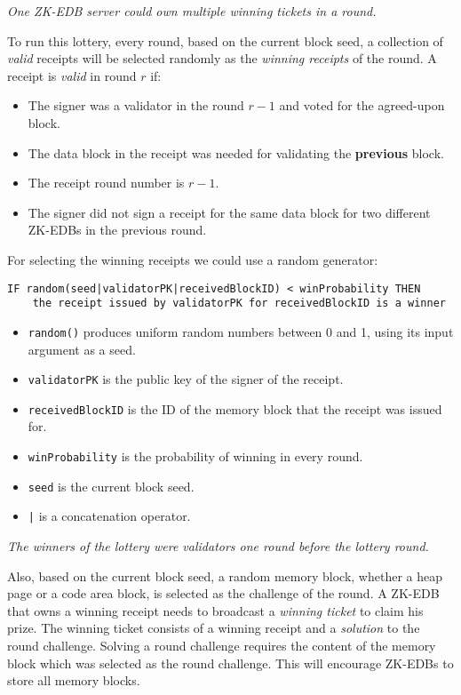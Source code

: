 \documentclass[11pt, a4paper]{report}
\newcommand{\note}[1] {
    \begin{tcolorbox}[colframe=white,colback=white]
        \emph{#1}
    \end{tcolorbox}
}
\begin{document}
    \note{One ZK-EDB server could own multiple winning tickets in a round.}

    To run this lottery, every round, based on the current block seed, a collection of \emph{valid} receipts will be
    selected randomly as the \emph{winning receipts} of the round. A receipt is \emph{valid} in round \(r\) if:

    \begin{itemize}
        \item The signer was a validator in the round \(r - 1\) and voted for the agreed-upon block.
        \item The data block in the receipt was needed for validating the \textbf{previous} block.
        \item The receipt round number is \(r - 1\).
        \item The signer did not sign a receipt for the same data block for two different ZK-EDBs in the previous round.
    \end{itemize}
    For selecting the winning receipts we could use a random generator:
    \begin{verbatim}
IF random(seed|validatorPK|receivedBlockID) < winProbability THEN
    the receipt issued by validatorPK for receivedBlockID is a winner
    \end{verbatim}
    \begin{itemize}
        \item \texttt{random()} produces uniform random numbers between 0 and 1, using its input argument as a seed.
        \item \texttt{validatorPK} is the public key of the signer of the receipt.
        \item \texttt{receivedBlockID} is the ID of the memory block that the receipt was issued for.
        \item \texttt{winProbability} is the probability of winning in every round.
        \item \texttt{seed} is the current block seed.
        \item \texttt{|} is a concatenation operator.
    \end{itemize}

    \note{The winners of the lottery were validators one round before the lottery round.}

    Also, based on the current block seed, a random memory block, whether a heap page or a code area block, is
    selected as the challenge of the round. A ZK-EDB that owns a winning receipt needs to broadcast a \emph{winning
    ticket} to claim his prize. The winning ticket consists of a winning receipt and a \emph{solution} to the round
    challenge. Solving a round challenge requires the content of the memory block which was selected as the round
    challenge. This will encourage ZK-EDBs to store all memory blocks.
\end{document}
